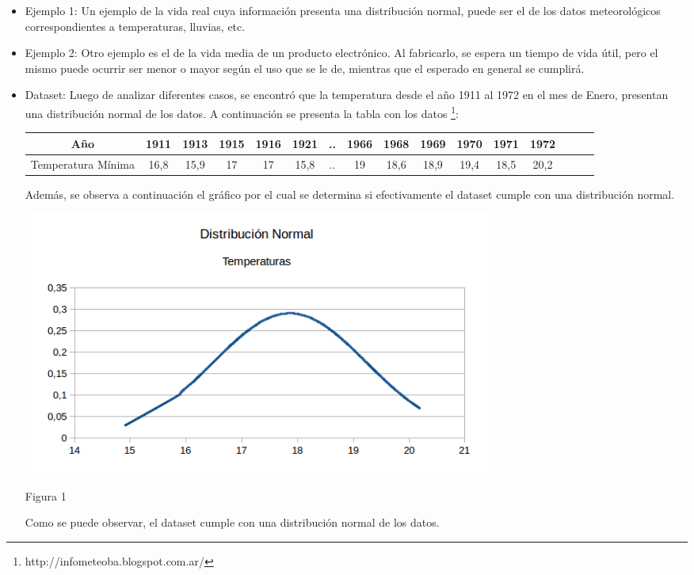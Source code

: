 \documentclass[10pt, a4paper,english,spanish,hidelinks]{article}
\begin{document}
\begin{itemize}
\item Ejemplo 1: Un ejemplo de la vida real cuya información presenta una distribución normal, puede ser el de los datos meteorológicos correspondientes a temperaturas, lluvias, etc. 

\item Ejemplo 2: Otro ejemplo es el de la vida media de un producto electrónico. Al fabricarlo, se espera un tiempo de vida útil, pero el mismo puede ocurrir ser menor o mayor según el uso que se le de, mientras que el esperado en general se cumplirá. 

\item Dataset: Luego de analizar diferentes casos, se encontró que la temperatura desde el año 1911 al 1972 en el mes de Enero, presentan una distribución normal de los datos. A continuación se presenta la tabla con los datos \footnote{http://infometeoba.blogspot.com.ar/}:

\begin{table}[htdp]
  \begin{center}
    \begin{tabular}{|c|c|c|c|c|c|c|c|c|c|c|c|c|c|c|c|} \hline
       Año  & 1911 & 1913 & 1915 & 1916 & 1921 & .. & 1966& 1968& 1969& 1970& 1971& 1972 \\ \hline
       Temperatura Mínima & 16,8 & 15,9 & 17 & 17 & 15,8 & .. & 19 & 18,6 & 18,9 & 19,4 & 18,5 & 20,2 \\ \hline
    \end{tabular}
  \end{center}
\end{table} 

Además, se observa a continuación el gráfico por el cual se determina si efectivamente el dataset cumple con una distribución normal.


\centerline{  \includegraphics[width=0.7\textwidth]{./imagenes/DatasetNormal.png}}
\centerline{Figura 1} 

Como se puede observar, el dataset cumple con una distribución normal de los datos. 


\end{itemize}
\end{document}
